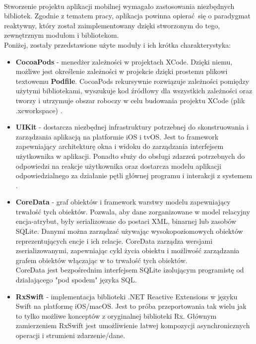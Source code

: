 \documentclass[12pt,oneside,a4paper]{report}
\begin{document}
\paragraph{}Stworzenie projektu aplikacji mobilnej wymagało zastosowania niezbędnych bibliotek. Zgodnie z tematem pracy, aplikacja powinna opierać się o paradygmat reaktywny, który został zaimplementowany dzięki stworzonym do tego, zewnętrznym modułom i bibliotekom. \\
Poniżej, zostały przedstawione użyte moduły i ich krótka charakterystyka:
\begin{itemize}

	\item  \textbf{CocoaPods} - menedżer zależności w projektach XCode. Dzięki niemu, możliwe jest określenie zależności w projekcie dzięki prostemu plikowi textowemu \textbf{Podfile}. CocoaPods rekursywnie rozwiązuje zależności pomiędzy użytymi bibliotekami, wyszukuje kod źródłowy dla wszystkich zależności oraz tworzy i utrzymuje obszar roboczy w celu budowania projektu XCode (plik .xcworkspace) \cite{cocoaPods}.
	
	\item  \textbf{UIKit} - dostarcza niezbędnej infrastruktury potrzebnej do skonstruowania i zarządzania aplikacją na platformie iOS i tvOS. Jest to framework zapewniający architekturę okna i widoku do zarządzania interfejsem użytkownika w aplikacji. Ponadto służy do obsługi zdarzeń potrzebnych do odpowiedzi na reakcje użytkownika oraz dostarcza modelu aplikacji odpowiedzialnego za działanie pętli głównej programu i interakcji z systemem \cite{UIKit}.
	
	\item  \textbf{CoreData} - graf obiektów \cite{objectGraph} i framework warstwy modelu zapewniający trwałość tych obiektów.
	Pozwala, aby dane zorganizowane w model relacyjny encja-atrybut, były serializowane do postaci XML, binarnej lub zasobów SQLite.
	Danymi można zarządzać używając wysokopoziomowych obiektów reprezentujących encje i ich relacje. CoreData zarządza wersjami zserializowanymi, zapewniając cykl życia obiektu i możliwość zarządzania grafem obiektów włączając w to trwałość tych obiektów.\\
	CoreData jest bezpośrednim interfejsem SQLite izolującym programistę od działającego "pod spodem" języka SQL.
	
	\item  \textbf{RxSwift} - implementacja biblioteki .NET Reactive Extensions w języku Swift na platformę iOS/macOS. Jest to próba przeportowania tak wielu jak to tylko możliwe konceptów z oryginalnej biblioteki Rx. Głównym zamierzeniem RxSwift jest umożliwienie łatwej kompozycji asynchronicznych operacji i strumieni zdarzenie/dane.
	

\end{itemize}
\end{document}
